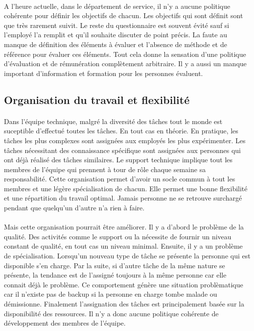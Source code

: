 \paragraph{}A l'heure actuelle, dans le département de service, il n'y a aucune politique cohérente pour définir les objectifs de chacun. Les objectifs qui sont définit sont que très rarement suivit. Le reste du questionnaire est souvent évité sauf si l'employé l'a remplit et qu'il souhaite discuter de point précis. La faute au manque de définition des éléments à évaluer et l'absence de méthode et de référence pour évaluer ces éléments. Tout cela donne la sensation d'une politique d'évaluation et de rémunération complètement arbitraire. Il y a aussi un manque important d'information et formation pour les personnes évaluent.



 


\subsection{Organisation du travail et flexibilité}
\paragraph*{} Dans l'équipe technique, malgré la diversité des tâches tout le monde est suceptible d'effectué toutes les tâches. En tout cas en théorie. En pratique, les tâches les plus complexes sont assignées aux employés les plus expérimenter. Les tâches nécessitant des connaissance spécifique sont assignées aux personnes qui ont déjà réalisé des tâches similaires. Le support technique implique tout les membres de l'équipe qui prennent à tour de rôle chaque semaine sa responsabilité. Cette organisation permet d'avoir un socle commun à tout les membres et une légère spécialisation de chacun. Elle permet une bonne flexibilité et une répartition du travail optimal. Jamais personne ne se retrouve surchargé pendant que quelqu'un d'autre n'a rien à faire. 

\paragraph{}Mais cette organisation pourrait être améliorer. Il y a d'abord le problème de la qualité. Des activités comme le support ou la nécessite de fournir un niveau constant de qualité, en tout cas un niveau minimal. Ensuite, il y a un problème de spécialisation. Lorsqu'un nouveau type de tâche se présente la personne qui est disponible s'en charge. Par la suite, si d'autre tâche de la même nature se présente, la tendance est de l'assigné toujours à la même personne car elle connait déjà le problème. Ce comportement génère une situation problèmatique car il n'existe pas de backup si la personne en charge tombe malade ou démissionne. 
Finalement l'assignation des tâches est principalement basée sur la disponibilité des ressources. Il n'y a donc aucune politique cohérente de développement des membres de l'équipe. 



